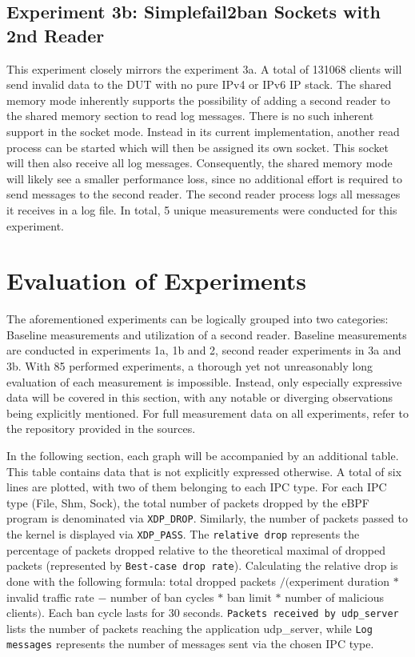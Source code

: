 \subsection{Experiment 3b: Simplefail2ban Sockets with 2nd Reader}
This experiment closely mirrors the experiment 3a.
A total of 131068 clients will send invalid data to the \ac{DUT} with no pure IPv4 or IPv6 \ac{IP} stack.
The shared memory mode inherently supports the possibility of adding a second reader to the shared memory section to read log messages.
There is no such inherent support in the socket mode.
Instead in its current implementation, another read process can be started which will then be assigned its own socket.
This socket will then also receive all log messages.
Consequently, the shared memory mode will likely see a smaller performance loss, since no additional effort is required to send messages to the second reader. 
The second reader process logs all messages it receives in a log file.
In total, 5 unique measurements were conducted for this experiment.

\newpage
\section{Evaluation of Experiments}
The aforementioned experiments can be logically grouped into two categories\@: Baseline measurements and utilization of a second reader.
Baseline measurements are conducted in experiments 1a, 1b and 2, second reader experiments in 3a and 3b.
With 85 performed experiments, a thorough yet not unreasonably long evaluation of each measurement is impossible.
Instead, only especially expressive data will be covered in this section, with any notable or diverging observations being explicitly mentioned.
For full measurement data on all experiments, refer to the repository provided in the sources\cite{git:repoOfThesis}.

In the following section, each graph will be accompanied by an additional table.
This table contains data that is not explicitly expressed otherwise.
A total of six lines are plotted, with two of them belonging to each \ac{IPC} type.
For each \ac{IPC} type (File, Shm, Sock), the total number of packets dropped by the \ac{eBPF} program is denominated via \texttt{XDP\_DROP}.
Similarly, the number of packets passed to the kernel is displayed via \texttt{XDP\_PASS}.
The \texttt{relative drop} represents the percentage of packets dropped relative to the theoretical maximal of dropped packets (represented by \texttt{Best-case drop rate}).
Calculating the relative drop is done with the following formula:
total dropped packets $/ ($experiment duration $*$ invalid traffic rate $-$ number of ban cycles $*$ ban limit $*$ number of malicious clients$)$.
Each ban cycle lasts for 30 seconds.
\texttt{Packets received by udp\_server} lists the number of packets reaching the application udp\_server, while \texttt{Log messages} represents the number of messages sent via the chosen \ac{IPC} type.

